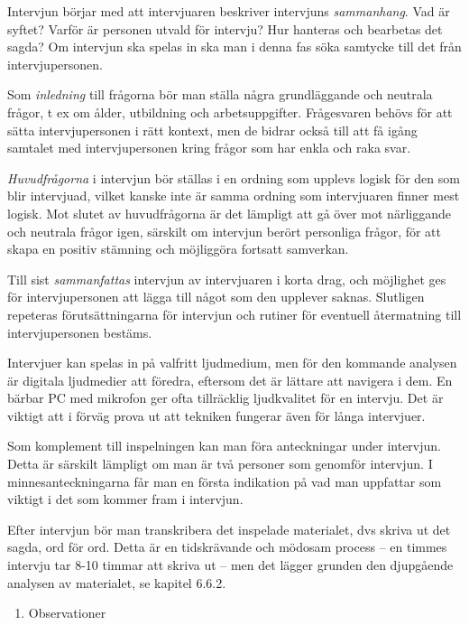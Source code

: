 Intervjun börjar med att intervjuaren beskriver intervjuns
\emph{sammanhang}. Vad är syftet? Varför är personen utvald för
intervju? Hur hanteras och bearbetas det sagda? Om intervjun ska spelas
in ska man i denna fas söka samtycke till det från intervjupersonen.

Som \emph{inledning} till frågorna bör man ställa några grundläggande
och neutrala frågor, t ex om ålder, utbildning och arbetsuppgifter.
Frågesvaren behövs för att sätta intervjupersonen i rätt kontext, men de
bidrar också till att få igång samtalet med intervjupersonen kring
frågor som har enkla och raka svar.

\emph{Huvudfrågorna} i intervjun bör ställas i en ordning som upplevs
logisk för den som blir intervjuad, vilket kanske inte är samma ordning
som intervjuaren finner mest logisk. Mot slutet av huvudfrågorna är det
lämpligt att gå över mot närliggande och neutrala frågor igen, särskilt
om intervjun berört personliga frågor, för att skapa en positiv stämning
och möjliggöra fortsatt samverkan.

Till sist \emph{sammanfattas} intervjun av intervjuaren i korta drag,
och möjlighet ges för intervjupersonen att lägga till något som den
upplever saknas. Slutligen repeteras förutsättningarna för intervjun och
rutiner för eventuell återmatning till intervjupersonen bestäms.

Intervjuer kan spelas in på valfritt ljudmedium, men för den kommande
analysen är digitala ljudmedier att föredra, eftersom det är lättare att
navigera i dem. En bärbar PC med mikrofon ger ofta tillräcklig
ljudkvalitet för en intervju. Det är viktigt att i förväg prova ut att
tekniken fungerar även för långa intervjuer.

Som komplement till inspelningen kan man föra anteckningar under
intervjun. Detta är särskilt lämpligt om man är två personer som
genomför intervjun. I minnesanteckningarna får man en första indikation
på vad man uppfattar som viktigt i det som kommer fram i intervjun.

Efter intervjun bör man transkribera det inspelade materialet, dvs
skriva ut det sagda, ord för ord. Detta är en tidskrävande och mödosam
process -- en timmes intervju tar 8-10 timmar att skriva ut -- men det
lägger grunden den djupgående analysen av materialet, se kapitel 6.6.2.

\begin{enumerate}
\def\labelenumi{\arabic{enumi}.}
\item
  Observationer
\end{enumerate}

